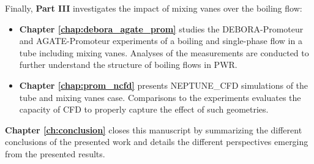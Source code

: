 Finally, \textbf{Part III} investigates the impact of mixing vanes over the boiling flow:

\begin{itemize}
\item \textbf{Chapter \ref{chap:debora_agate_prom}} studies the DEBORA-Promoteur and AGATE-Promoteur experiments of a boiling and single-phase flow in a tube including mixing vanes. Analyses of the measurements are conducted to further understand the structure of boiling flows in PWR.

\item \textbf{Chapter \ref{chap:prom_ncfd}} presents NEPTUNE\_CFD simulations of the tube and mixing vanes case. Comparisons to the experiments evaluates the capacity of CFD to properly capture the effect of such geometries.
\end{itemize}

\textbf{Chapter \ref{ch:conclusion}} closes this manuscript by summarizing the different conclusions of the presented work and details the different perspectives emerging from the presented results.